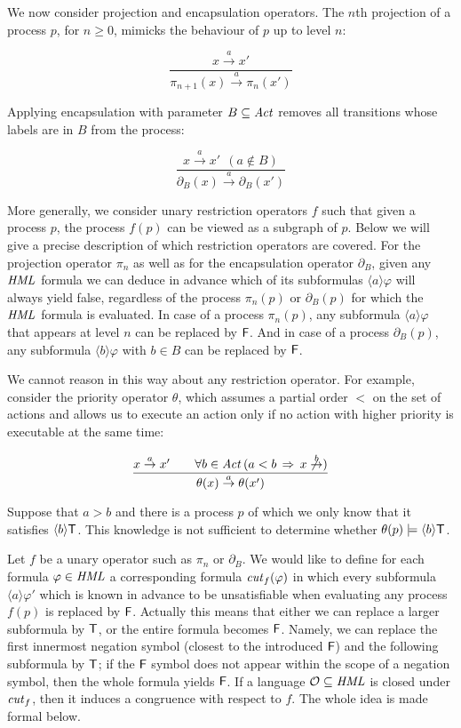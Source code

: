 \documentclass{eptcs}
\def\hmo{{\cal O}}
\def\hml{{\it HML}}
\def\enc{\partial}
\def\transa{\stackrel{a}{\rightarrow}}
\def\transa{\stackrel{a}{\rightarrow}}
\def\transb{\stackrel{b}{\rightarrow}}
\def\true{{\sf T}}
\def\false{{\sf F}}
\newcommand{\diam}[1]{\langle#1\rangle}
\begin{document}
We now consider projection and encapsulation operators. The $n$th projection of a process $p$, for $n\geq 0$, mimicks the behaviour of $p$ up to level $n$:
\begin{center}
\[ \frac{x \stackrel{a}{\rightarrow}x'}{\pi_{n+1}(x)\stackrel{a}{\rightarrow}\pi_{n}(x')} \]
\end{center}
Applying encapsulation with parameter $B \subseteq {\it Act}$ removes all transitions whose labels are in $B$ from the process:
\begin{center}
\[ \frac{x \stackrel{a}{\rightarrow}x'~~(a \not \in B)}{\enc_{B}(x)\stackrel{a}{\rightarrow}\enc_{B}(x')} \]
\end{center}
More generally, we consider unary restriction operators $f$ such that given a process $p$, the process $f(p)$ can be viewed as a subgraph of $p$. Below we will give a precise description of which restriction operators are covered. For the projection operator $\pi_n$ as well as for the encapsulation operator $\enc_B$, given any $\hml$ formula we can deduce in advance which of its subformulas $\diam{a} \varphi$ will always yield false, regardless of the process $\pi_n(p)$ or $\enc_B(p)$ for which the $\hml$ formula is evaluated. In case of a process $\pi_n(p)$, any subformula $\diam{a} \varphi$ that appears at level $n$ can be replaced by $\false$. And in case of a process $\enc_B(p)$, any subformula $\diam{b} \varphi$ with $b \in B$ can be replaced by $\false$.

We cannot reason in this way about any restriction operator. For example, consider the priority operator $\theta$, which assumes a partial order $<$ on the set of actions and allows us to execute an action only if no action with higher priority is executable at the same time:
\begin{center}
\[ \frac{x \transa x' ~~~~~~ \forall b\in{\it Act}\,(a<b\,\Rightarrow\, x \not \transb)} {\theta(x) \transa \theta(x')} \]
\end{center}
Suppose that $a > b$ and there is a process $p$ of which we only know that it satisfies $\diam{b} \true$. This knowledge is not sufficient to determine whether $\theta(p) \models \diam{b} \true$.

Let $f$ be a unary operator such as $\pi_n$ or $\enc_B$. We would like to define for each formula $\varphi \in \hml$ a corresponding formula ${\it cut}_f(\varphi)$ in which every subformula $\diam{a} \varphi'$ which is known in advance to be unsatisfiable when evaluating any process $f(p)$ is replaced by $\false$. Actually this means that either we can replace a larger subformula by $\true$, or the entire formula becomes $\false$. Namely, we can replace the first innermost negation symbol (closest to the introduced $\false$) and the following subformula by $\true$; if the $\false$ symbol does not appear within the scope of a negation symbol, then the whole formula yields $\false$. If a language $\hmo\subseteq\hml$ is closed under ${\it cut}_f$, then it induces a congruence with respect to $f$. The whole idea is made formal below.
\end{document}
